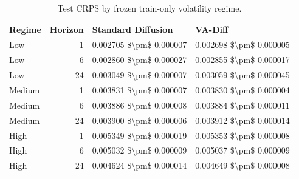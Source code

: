 \begin{table}
\caption{Test CRPS by frozen train-only volatility regime.}
\label{tab:regime-crps}
\begin{tabular}{lrll}
\toprule
Regime & Horizon & Standard Diffusion & VA-Diff \\
\midrule
Low & 1 & 0.002705 \$\textbackslash pm\$ 0.000007 & 0.002698 \$\textbackslash pm\$ 0.000005 \\
Low & 6 & 0.002860 \$\textbackslash pm\$ 0.000027 & 0.002855 \$\textbackslash pm\$ 0.000017 \\
Low & 24 & 0.003049 \$\textbackslash pm\$ 0.000007 & 0.003059 \$\textbackslash pm\$ 0.000045 \\
Medium & 1 & 0.003831 \$\textbackslash pm\$ 0.000007 & 0.003830 \$\textbackslash pm\$ 0.000004 \\
Medium & 6 & 0.003886 \$\textbackslash pm\$ 0.000008 & 0.003884 \$\textbackslash pm\$ 0.000011 \\
Medium & 24 & 0.003900 \$\textbackslash pm\$ 0.000006 & 0.003912 \$\textbackslash pm\$ 0.000014 \\
High & 1 & 0.005349 \$\textbackslash pm\$ 0.000019 & 0.005353 \$\textbackslash pm\$ 0.000008 \\
High & 6 & 0.005032 \$\textbackslash pm\$ 0.000009 & 0.005037 \$\textbackslash pm\$ 0.000009 \\
High & 24 & 0.004624 \$\textbackslash pm\$ 0.000014 & 0.004649 \$\textbackslash pm\$ 0.000008 \\
\bottomrule
\end{tabular}
\end{table}
